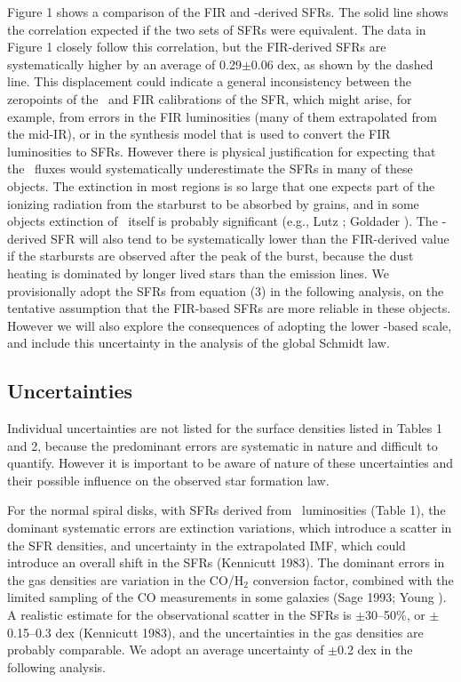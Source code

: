 Figure 1 shows a comparison of the FIR and \brgamma-derived SFRs.
The solid line shows the correlation expected
if the two sets of SFRs were equivalent.  The data in Figure 1 closely
follow this correlation, but the FIR-derived SFRs 
are systematically higher by an average of 0.29$\pm$0.06 dex,  
as shown by the dashed line.  This displacement could indicate a 
general inconsistency between the zeropoints of the \halpha\ and
FIR calibrations of the SFR, which might arise, for example, from errors
in the FIR luminosities (many of them extrapolated from the mid-IR), or
in the synthesis model that is used to convert the FIR luminosities to SFRs.
However there is physical justification for expecting that the \brgamma\ 
fluxes would systematically underestimate the SFRs in many of these objects.  
The extinction in most regions is so large that one expects part of
the ionizing radiation from the starburst to be absorbed by grains,
and in some objects extinction of \brgamma\ itself is probably significant
(e.g., Lutz \etal 1996; Goldader \etal 1997).
The \brgamma-derived SFR will also tend to be systematically lower
than the FIR-derived value if the starbursts are observed after the
peak of the burst, because the dust heating is dominated by longer lived
stars than the emission lines.  We provisionally adopt the 
SFRs from equation (3) in the following analysis, on the tentative 
assumption that the FIR-based SFRs are more reliable in these objects.
However we will also explore the consequences of adopting the lower 
\brgamma-based scale, and include this uncertainty in the analysis of 
the global Schmidt law.

\subsection{Uncertainties}

Individual uncertainties are not listed for the surface densities listed 
in Tables 1 and 2, because the predominant errors are systematic in nature and 
difficult to quantify.  However it is important to be aware of nature of these 
uncertainties and their possible influence on the observed star formation 
law.

For the normal spiral disks, with SFRs derived from \halpha\ 
luminosities (Table 1), the dominant systematic errors are extinction 
variations, which introduce a scatter in the SFR densities, and  
uncertainty in the extrapolated IMF, which could introduce an overall 
shift in the SFRs (Kennicutt 1983).  The dominant errors in the  
gas densities are variation in the CO/H$_2$ conversion factor, combined
with the limited sampling of the CO measurements in some galaxies  
(Sage 1993; Young \etal 1995).  A realistic estimate for the observational 
scatter in the SFRs is $\pm$30--50\%, or $\pm$0.15--0.3 dex 
(Kennicutt 1983), and the uncertainties in the gas densities are probably
comparable.  We adopt an average uncertainty of $\pm$0.2 dex in the
following analysis.

